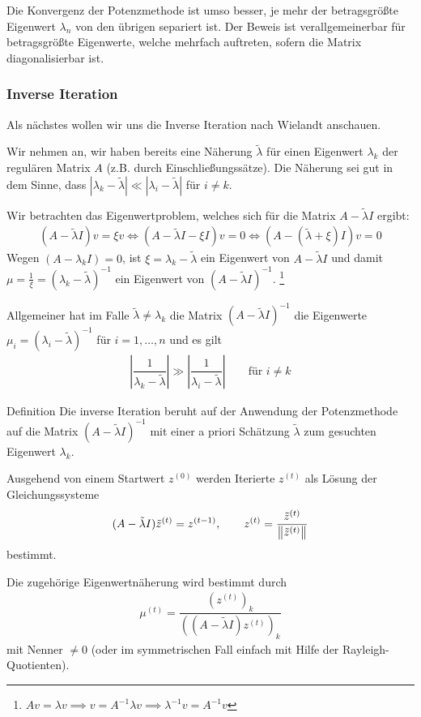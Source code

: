 Die Konvergenz der Potenzmethode ist umso besser, je mehr der betragsgrößte Eigenwert $\lambda_n$ von den übrigen 
separiert ist. Der Beweis ist verallgemeinerbar für betragsgrößte Eigenwerte, welche mehrfach 
auftreten, sofern die Matrix diagonalisierbar ist. 

\subsubsection{Inverse Iteration} 
Als nächstes wollen wir uns die \glqq{}Inverse Iteration\grqq{} nach
Wielandt anschauen. 

Wir nehmen an, wir haben bereits eine Näherung $\tilde{\lambda}$ für einen Eigenwert $\lambda_k$ der regulären Matrix 
$A$ (z.B. durch Einschließungssätze). Die Näherung sei gut in dem Sinne, 
dass $|\lambda_k-\tilde{\lambda}|\ll |\lambda_i-\tilde{\lambda}|$ für $i\neq k$.

Wir betrachten das Eigenwertproblem, welches sich für die Matrix $A-\tilde{\lambda}I$ ergibt:
%
\begin{align*}
  (A-\tilde{\lambda}I)v
  = \xi v 
  \iff 
  (A-\tilde{\lambda}I-\xi I)v 
  = 0 
  \iff (A-(\tilde{\lambda}+\xi)I)v
  = 0
\end{align*}
%
Wegen $(A-\lambda_kI)=0$, ist $\xi=\lambda_k-\tilde{\lambda}$ ein Eigenwert von $A-\tilde{\lambda}I$ und damit 
$\mu=\tfrac{1}{\xi}=(\lambda_k-\tilde{\lambda})^{-1}$ ein Eigenwert von $(A-\tilde{\lambda}I)^{-1}$.
\footnote{
    $Av=\lambda v \implies v = A^{-1}\lambda v \implies \lambda^{-1}v = A^{-1}v$
  } 

Allgemeiner hat im Falle $\tilde{\lambda}\neq\lambda_k$ die Matrix $(A-\tilde{\lambda}I)^{-1}$ die Eigenwerte 
$\mu_i = (\lambda_i-\tilde{\lambda})^{-1}$ für $i=1,\dots,n$ und es gilt 
%
\begin{align*}
  \left|\dfrac{1}{\lambda_k-\tilde{\lambda}}\right| 
  \gg \left|\dfrac{1}{\lambda_i-\tilde{\lambda}}\right|
  \qquad \text{für } i\neq k
\end{align*}

\begin{colbox}{Definition}
  Die inverse Iteration beruht auf der Anwendung der Potenzmethode auf die Matrix $(A-\tilde{\lambda}I)^{-1}$
  mit einer a priori Schätzung $\tilde{\lambda}$ zum gesuchten Eigenwert $\lambda_k$. 

  Ausgehend von einem Startwert $z^{(0)}$ werden Iterierte $z^{(t)}$ als Lösung der Gleichungssysteme
  \begin{align*}
    (A-\tilde{\lambda}I)\tilde{z}^{(t)} 
    = z^{(t-1)},
    \qquad 
    z^{(t)} 
    = \dfrac{\tilde{z}^{(t)}}{\vertn{2}{\tilde{z}^{(t)}}}
  \end{align*}
  bestimmt.

  Die zugehörige Eigenwertnäherung wird bestimmt durch 
  \begin{align*}
    \mu^{(t)}=\dfrac{(z^{(t)})_k}{((A-\tilde{\lambda}I)z^{(t)})_k}
  \end{align*}
  mit Nenner $\neq 0$ (oder im symmetrischen Fall einfach mit Hilfe der Rayleigh-Quotienten).
\end{colbox}

